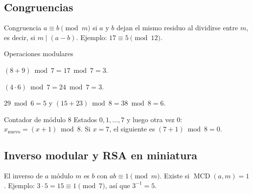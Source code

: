 

\subsection{Congruencias}
\begin{tmdef}{Congruencia}
$a\equiv b\pmod m$ si $a$ y $b$ dejan el mismo residuo al dividirse entre $m$, es decir, si $m\mid(a-b)$. Ejemplo: $17\equiv5\pmod{12}$.
\end{tmdef}

\begin{center}
\end{center}

\begin{tmejemplo}{Operaciones modulares}
\begin{tmpasos}
\item $(8+9)\bmod7=17\bmod7=3$.
\item $(4\cdot6)\bmod7=24\bmod7=3$.
\item $29\bmod6=5$ y $(15+23)\bmod8=38\bmod8=6$.
\end{tmpasos}
\end{tmejemplo}

\begin{tmejemplo}{Contador de m\'odulo 8}
Estados $0, 1,\dots,7$ y luego otra vez $0$: $x_{\text{nuevo}}=(x+1)\bmod8$. Si $x=7$, el siguiente es $(7+1)\bmod8=0$.
\end{tmejemplo}

\subsection{Inverso modular y RSA en miniatura}
El inverso de $a$ m\'odulo $m$ es $b$ con $ab\equiv1\pmod m$. Existe si $\operatorname{MCD}(a, m)=1$. Ejemplo: $3\cdot5=15\equiv1\pmod7$, as\'i que $3^{-1}=5$.

